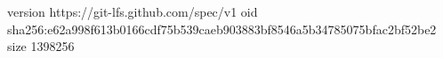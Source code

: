 version https://git-lfs.github.com/spec/v1
oid sha256:e62a998f613b0166cdf75b539caeb903883bf8546a5b34785075bfac2bf52be2
size 1398256
